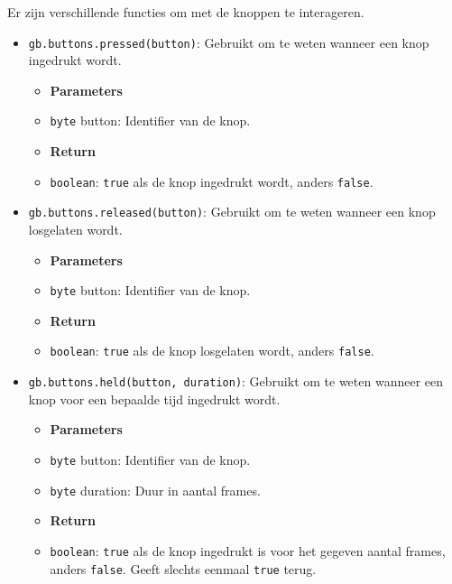 \documentclass[a4paper,titlepage,12pt]{article}
\begin{document}
	Er zijn verschillende functies om met de knoppen te interageren.
	\begin{itemize}
		\item \texttt{gb.buttons.pressed(button)}: 
		Gebruikt om te weten wanneer een knop ingedrukt wordt.
		\begin{itemize}
			\item [] \textbf{Parameters}
			\item \texttt{byte} button: Identifier van de knop.
		\end{itemize}
		\begin{itemize}
			\item [] \textbf{Return}
			\item \texttt{boolean}:  \texttt{true} als de knop ingedrukt wordt, anders \texttt{false}.
		\end{itemize}
	
		\samepage\item \texttt{gb.buttons.released(button)}: Gebruikt om te weten wanneer een knop losgelaten wordt.
		\begin{itemize}
			\item [] \textbf{Parameters}
			\item \texttt{byte} button: Identifier van de knop.
		\end{itemize}
		\begin{itemize}
			\item [] \textbf{Return}
			\item \texttt{boolean}: \texttt{true} als de knop losgelaten wordt, anders \texttt{false}.
		\end{itemize}
	
		\item \texttt{gb.buttons.held(button, duration)}: Gebruikt om te weten wanneer een knop voor een bepaalde tijd ingedrukt wordt.
		\begin{itemize}
			\item [] \textbf{Parameters}
			\item \texttt{byte} button: Identifier van de knop.
			\item \texttt{byte} duration: Duur in aantal frames.
		\end{itemize}
		\begin{itemize}
			\item [] \textbf{Return}
			\item \texttt{boolean}: \texttt{true} als de knop ingedrukt is voor het gegeven aantal frames, anders \texttt{false}. Geeft slechts eenmaal \texttt{true} terug.
		\end{itemize}
	

\end{itemize}
\end{document}
